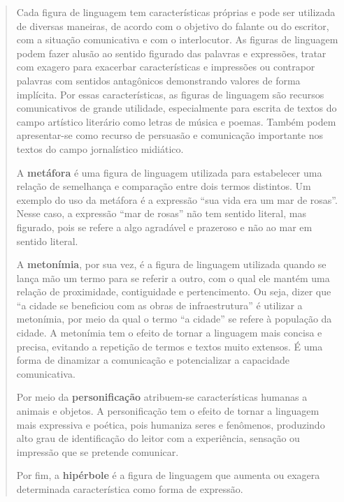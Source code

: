 {\begin{quote}
{Cada figura de linguagem tem características próprias e pode ser
utilizada de diversas maneiras, de acordo com o objetivo do falante ou
do escritor, com a situação comunicativa e com o interlocutor. As
figuras de linguagem podem fazer alusão ao sentido figurado das palavras
e expressões, tratar com exagero para exacerbar características e
impressões ou contrapor palavras com sentidos antagônicos demonstrando
valores de forma implícita. Por essas características, as figuras de
linguagem são recursos comunicativos de grande utilidade, especialmente
para escrita de textos do campo artístico literário como letras de
música e poemas. Também podem apresentar-se como recurso de persuasão e
comunicação importante nos textos do campo jornalístico
midiático.

A \textbf{metáfora} é uma figura de linguagem utilizada para
estabelecer uma relação de semelhança e comparação entre dois termos
distintos. Um exemplo do uso da metáfora é a expressão ``sua vida era um
mar de rosas''. Nesse caso, a expressão ``mar de rosas'' não tem sentido
literal, mas figurado, pois se refere a algo agradável e
prazeroso e não ao mar em sentido literal.

A \textbf{metonímia}, por sua vez, é a figura de linguagem utilizada quando se
lança mão um termo para se referir a outro, com o qual ele mantém uma
relação de proximidade, contiguidade e pertencimento. Ou seja, dizer que
``a cidade se beneficiou com as obras de infraestrutura'' é utilizar a metonímia,
por meio da qual o termo ``a cidade'' se refere à população da cidade. A metonímia
tem o efeito de tornar a linguagem mais concisa e precisa, evitando a repetição de
termos e textos muito extensos. É uma forma de dinamizar a comunicação e
potencializar a capacidade comunicativa.

Por meio da \textbf{personificação} atribuem-se características humanas a animais
e objetos. A personificação tem o efeito de tornar a linguagem mais expressiva e 
poética, pois humaniza seres e fenômenos, produzindo alto grau de identificação do
leitor com a experiência, sensação ou impressão que se pretende comunicar.

Por fim, a \textbf{hipérbole} é a figura de linguagem que aumenta ou exagera
determinada característica como forma de expressão.


}
\end{quote}}
